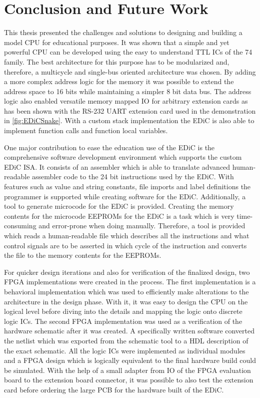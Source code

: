 
\chapter{Conclusion and Future Work}\label{cha:conclusion}
This thesis presented the challenges and solutions to designing and building a model \gls{CPU} for educational purposes.
It was shown that a simple and yet powerful \gls{CPU} can be developed using the easy to understand \gls{TTL} \glspl{IC} of the 74 family.
The best architecture for this purpose has to be modularized and, therefore, a multicycle and single-bus oriented architecture was chosen.
By adding a more complex address logic for the memory it was possible to extend the address space to 16 bits while maintaining a simpler 8 bit data bus.
The address logic also enabled versatile memory mapped \gls{IO} for arbitrary extension cards as has been shown with the RS-232 \gls{UART} extension card used in the demonstration in \cref{fig:EDiCSnake}.
With a custom stack implementation the \gls{EDiC} is also able to implement function calls and function local variables.

One major contribution to ease the education use of the \gls{EDiC} is the comprehensive software development environment which supports the custom \gls{EDiC} \gls{ISA}.
It consists of an assembler which is able to translate advanced human-readable assembler code to the 24 bit instructions used by the \gls{EDiC}.
With features such as value and string constants, file imports and label definitions the programmer is supported while creating software for the \gls{EDiC}.
Additionally, a tool to generate microcode for the \gls{EDiC} is provided.
Creating the memory contents for the microcode \glspl{EEPROM} for the \gls{EDiC} is a task which is very time-consuming and error-prone when doing manually.
Therefore, a tool is provided which reads a human-readable file which describes all the instructions and what control signals are to be asserted in which cycle of the instruction and converts the file to the memory contents for the \glspl{EEPROM}.

For quicker design iterations and also for verification of the finalized design, two \gls{FPGA} implementations were created in the process.
The first implementation is a behavioral implementation which was used to efficiently make alterations to the architecture in the design phase.
With it, it was easy to design the \gls{CPU} on the logical level before diving into the details and mapping the logic onto discrete logic \glspl{IC}.
The second \gls{FPGA} implementation was used as a verification of the hardware schematic after it was created.
A specifically written software converted the netlist which was exported from the schematic tool to a \gls{HDL} description of the exact schematic.
All the logic \glspl{IC} were implemented as individual modules and a \gls{FPGA} design which is logically equivalent to the final hardware build could be simulated.
With the help of a small adapter from \gls{IO} of the \gls{FPGA} evaluation board to the extension board connector, it was possible to also test the extension card before ordering the large \gls{PCB} for the hardware built of the \gls{EDiC}.

